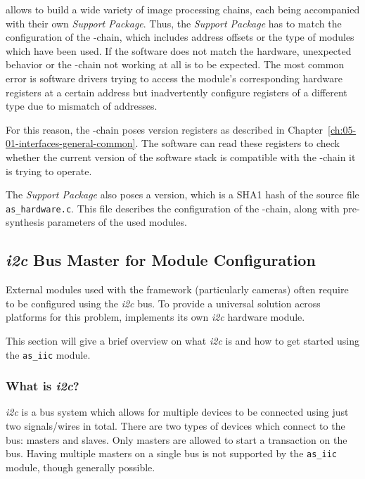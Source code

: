 \asterics allows to build a wide variety of image processing chains, each being accompanied with their own \textit{\asterics Support Package}.
Thus, the \textit{\asterics Support Package} has to match the configuration of the \asterics-chain, which includes address offsets or the type of modules which have been used.
If the software does not match the hardware, unexpected behavior or the \asterics-chain not working at all is to be expected.
The most common error is software drivers trying to access the module's corresponding hardware registers at a certain address but inadvertently configure registers of a different type due to mismatch of addresses.

For this reason, the \asterics-chain poses version registers as described in Chapter~\ref{ch:05-01-interfaces-general-common}.
The software can read these registers to check whether the current version of the software stack is compatible with the \asterics-chain it is trying to operate.

The \textit{\asterics Support Package} also poses a version, which is a SHA1 hash of the source file \texttt{as\_hardware.c}.
This file describes the configuration of the \asterics-chain, along with pre-synthesis parameters of the used modules.



\subsection{\textit{i2c} Bus Master for Module Configuration}




External modules used with the \asterics framework (particularly cameras) often require to be configured using the \textit{i2c} bus. To provide a universal solution across platforms for this problem, \asterics implements its own \textit{i2c} hardware module.

This section will give a brief overview on what \textit{i2c} is and how to get started using the \texttt{as\_iic} module. 

\subsubsection{What is \textit{i2c}?}

\textit{i2c} is a bus system which allows for multiple devices to be connected using just two signals/wires in total. There are two types of devices which connect to the bus: masters and slaves.
Only masters are allowed to start a transaction on the bus. Having multiple masters on a single bus is not supported by the \texttt{as\_iic} module, though generally possible.

